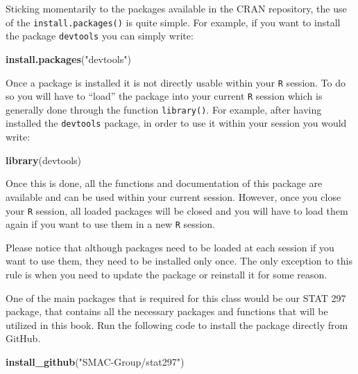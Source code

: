 \documentclass[12pt,]{krantz}
\newenvironment{Shaded}{\begin{snugshade}}{\end{snugshade}}
\newcommand{\KeywordTok}[1]{\textcolor[rgb]{0.27,0.27,0.27}{\textbf{#1}}}
\newcommand{\StringTok}[1]{\textcolor[rgb]{0.5,0.5,0.5}{#1}}
\newcommand{\NormalTok}[1]{#1}
\let\BeginKnitrBlock\begin \let\EndKnitrBlock\end
\begin{document}
Sticking momentarily to the packages available in the CRAN repository,
the use of the \texttt{install.packages()} is quite simple. For example,
if you want to install the package \texttt{devtools} you can simply
write:

\begin{Shaded}
\begin{Highlighting}[]
\KeywordTok{install.packages}\NormalTok{(}\StringTok{"devtools"}\NormalTok{)}
\end{Highlighting}
\end{Shaded}

Once a package is installed it is not directly usable within your
\texttt{R} session. To do so you will have to ``load'' the package into
your current \texttt{R} session which is generally done through the
function \texttt{library()}. For example, after having installed the
\texttt{devtools} package, in order to use it within your session you
would write:

\begin{Shaded}
\begin{Highlighting}[]
\KeywordTok{library}\NormalTok{(devtools)}
\end{Highlighting}
\end{Shaded}

Once this is done, all the functions and documentation of this package
are available and can be used within your current session. However, once
you close your \texttt{R} session, all loaded packages will be closed
and you will have to load them again if you want to use them in a new
\texttt{R} session.

\BeginKnitrBlock{rmdnote}
Please notice that although packages need to be loaded at each session
if you want to use them, they need to be installed only once. The only
exception to this rule is when you need to update the package or
reinstall it for some reason.
\EndKnitrBlock{rmdnote}

One of the main packages that is required for this class would be our
STAT 297 package, that contains all the necessary packages and functions
that will be utilized in this book. Run the following code to install
the package directly from GitHub.

\begin{Shaded}
\begin{Highlighting}[]
\KeywordTok{install_github}\NormalTok{(}\StringTok{"SMAC-Group/stat297"}\NormalTok{)}
\end{Highlighting}
\end{Shaded}
\end{document}

